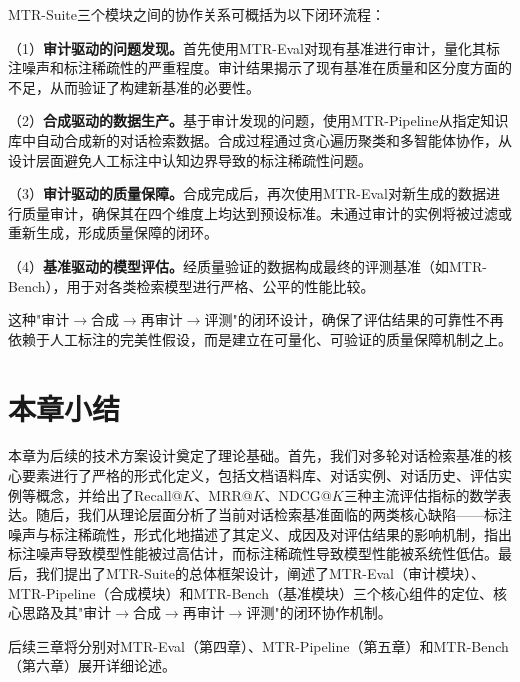 MTR-Suite三个模块之间的协作关系可概括为以下闭环流程：

（1）\textbf{审计驱动的问题发现。}首先使用MTR-Eval对现有基准进行审计，量化其标注噪声和标注稀疏性的严重程度。审计结果揭示了现有基准在质量和区分度方面的不足，从而验证了构建新基准的必要性。
    
（2）\textbf{合成驱动的数据生产。}基于审计发现的问题，使用MTR-Pipeline从指定知识库中自动合成新的对话检索数据。合成过程通过贪心遍历聚类和多智能体协作，从设计层面避免人工标注中认知边界导致的标注稀疏性问题。
    
（3）\textbf{审计驱动的质量保障。}合成完成后，再次使用MTR-Eval对新生成的数据进行质量审计，确保其在四个维度上均达到预设标准。未通过审计的实例将被过滤或重新生成，形成质量保障的闭环。
    
（4）\textbf{基准驱动的模型评估。}经质量验证的数据构成最终的评测基准（如MTR-Bench），用于对各类检索模型进行严格、公平的性能比较。


这种"审计$\rightarrow$合成$\rightarrow$再审计$\rightarrow$评测"的闭环设计，确保了评估结果的可靠性不再依赖于人工标注的完美性假设，而是建立在可量化、可验证的质量保障机制之上。


\section{本章小结}
\label{sec:chapter3_summary}

本章为后续的技术方案设计奠定了理论基础。首先，我们对多轮对话检索基准的核心要素进行了严格的形式化定义，包括文档语料库、对话实例、对话历史、评估实例等概念，并给出了Recall@$K$、MRR@$K$、NDCG@$K$三种主流评估指标的数学表达。随后，我们从理论层面分析了当前对话检索基准面临的两类核心缺陷——标注噪声与标注稀疏性，形式化地描述了其定义、成因及对评估结果的影响机制，指出标注噪声导致模型性能被过高估计，而标注稀疏性导致模型性能被系统性低估。最后，我们提出了MTR-Suite的总体框架设计，阐述了MTR-Eval（审计模块）、MTR-Pipeline（合成模块）和MTR-Bench（基准模块）三个核心组件的定位、核心思路及其"审计$\rightarrow$合成$\rightarrow$再审计$\rightarrow$评测"的闭环协作机制。

后续三章将分别对MTR-Eval（第四章）、MTR-Pipeline（第五章）和MTR-Bench（第六章）展开详细论述。






